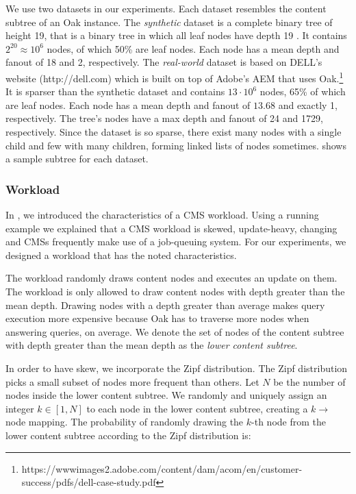 \documentclass[abstracton,12pt]{scrartcl}
\theoremstyle{definition}
\begin{document}
We use two datasets in our experiments. Each dataset resembles the content
subtree of an Oak instance. The \textit{synthetic} dataset is a complete binary
tree of height 19, that is a binary tree in which all leaf nodes have depth 19
\cite{Cormen}. It contains $2^{20} \approx 10^6$ nodes, of which 50\% are leaf
nodes. Each node has a mean depth and fanout of 18 and 2, respectively. The
\textit{real-world} dataset is based on DELL's website (http://dell.com)
which is built on top of Adobe's AEM that uses Oak.\footnote{https://wwwimages2.adobe.com/content/dam/acom/en/customer-success/pdfs/dell-case-study.pdf}
It is sparser than the synthetic dataset and contains $13 \cdot 10^6$
nodes, 65\% of which are leaf nodes. Each node has a mean depth and fanout of
$13.68$ and exactly 1, respectively. The tree's nodes have a max depth and fanout of 24
and 1729, respectively. Since the dataset is so sparse, there exist many nodes with a single child and few with many children, forming linked lists \cite{Cormen} of nodes
sometimes.  shows a sample subtree for each dataset.

\subsubsection{Workload}

\label{sec:workload}

In , we introduced the characteristics of a CMS
workload. Using a running example we explained that a CMS workload is skewed,
update-heavy, changing and CMSs frequently make use of a job-queuing system.
For our experiments, we designed a workload that has the noted characteristics.

The workload randomly draws content nodes and executes an update on them.
The workload is only allowed to draw content nodes with depth greater than
the mean depth. Drawing nodes with a depth greater than average makes query
execution more expensive because Oak has to traverse more nodes when answering
queries, on average. We denote the set of nodes of the content subtree with
depth greater than the mean depth as the \textit{lower content subtree}.

In order to have skew, we incorporate the Zipf distribution. The Zipf
distribution picks a small subset of nodes more frequent than others. 
Let $N$ be the number of nodes inside the lower content subtree.
We randomly and uniquely assign an integer $k \in [1, N]$ to each node in the
lower content subtree, creating 
a $k \rightarrow$ node mapping. The probability of randomly drawing the $k$-th node 
from the lower content subtree according to the Zipf distribution is:
\end{document}
